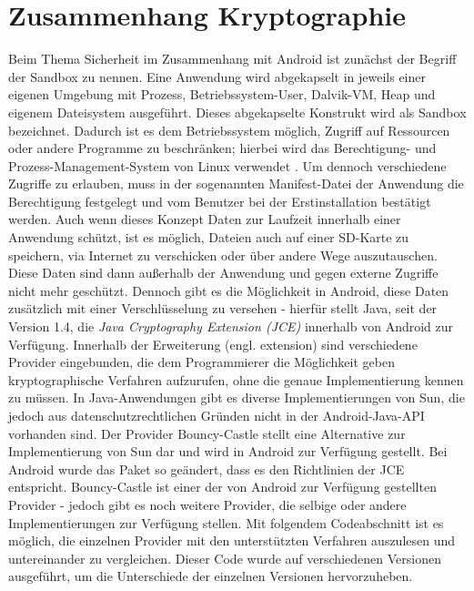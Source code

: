 \documentclass[10pt, a4paper,headsepline]{scrreprt}
\begin{document}
\section{Zusammenhang Kryptographie}
Beim Thema Sicherheit im Zusammenhang mit Android ist zunächst der Begriff der Sandbox zu nennen. Eine Anwendung wird abgekapselt in jeweils einer eigenen Umgebung mit Prozess, Betriebssystem-User, Dalvik-VM, Heap und eigenem Dateisystem ausgeführt. Dieses abgekapselte Konstrukt wird als Sandbox bezeichnet. Dadurch ist es dem Betriebssystem möglich, Zugriff auf Ressourcen oder andere Programme zu beschränken; hierbei wird das Berechtigung- und Prozess-Management-System von Linux verwendet \citep[S. 33]{book:android44}.
Um dennoch verschiedene Zugriffe zu erlauben, muss in der sogenannten Manifest-Datei der Anwendung die Berechtigung festgelegt und vom Benutzer bei der Erstinstallation bestätigt werden.
Auch wenn dieses Konzept Daten zur Laufzeit innerhalb einer Anwendung schützt, ist es möglich, Dateien auch auf einer SD-Karte zu speichern, via Internet zu verschicken oder über andere Wege auszutauschen. Diese Daten sind dann außerhalb der Anwendung und gegen externe Zugriffe nicht mehr geschützt.
Dennoch gibt es die Möglichkeit in Android, diese Daten zusätzlich mit einer Verschlüsselung zu versehen - hierfür stellt Java, seit der Version 1.4, die \textit{Java Cryptography Extension (JCE)} innerhalb von Android zur Verfügung. Innerhalb der Erweiterung (engl. extension) sind verschiedene Provider eingebunden, die dem Programmierer die Möglichkeit geben kryptographische Verfahren aufzurufen, ohne die genaue Implementierung kennen zu müssen. In Java-Anwendungen gibt es diverse Implementierungen von Sun, die jedoch aus datenschutzrechtlichen Gründen nicht in der Android-Java-API vorhanden sind. Der Provider Bouncy-Castle stellt eine Alternative zur Implementierung von Sun dar und wird in Android zur Verfügung gestellt. Bei Android wurde das Paket so geändert, dass es den Richtlinien der JCE entspricht. 
Bouncy-Castle ist einer der von Android zur Verfügung gestellten Provider - jedoch gibt es noch weitere Provider, die selbige oder andere Implementierungen zur Verfügung stellen. Mit folgendem Codeabschnitt ist es möglich, die einzelnen Provider mit den unterstützten Verfahren auszulesen und untereinander zu vergleichen. Dieser Code wurde auf verschiedenen Versionen ausgeführt, um die Unterschiede der einzelnen Versionen hervorzuheben. \\
\end{document}
